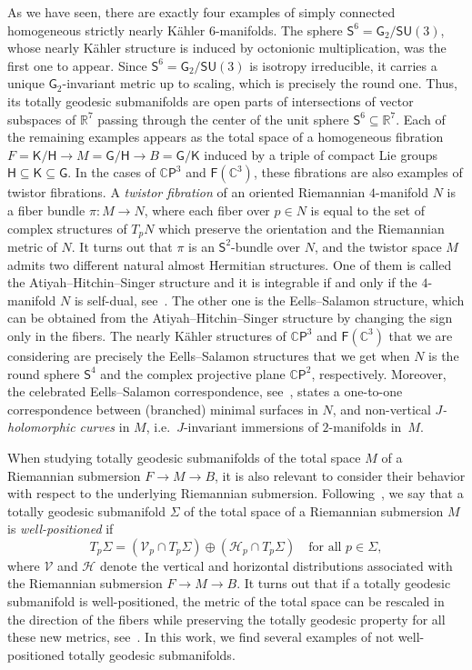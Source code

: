 \documentclass[11pt,a4paper,final]{amsart}
\newcommand{\s}{\mathsf}
\newcommand{\R}{\mathbb{R}}
\newcommand{\C}{\mathbb{C}}
\theoremstyle{definition}
\begin{document}
As we have seen, there are exactly four examples of  simply connected homogeneous strictly nearly Kähler $6$-manifolds.
The sphere $\s{S}^6=\s{G}_2/\s{SU}(3)$, whose nearly Kähler structure is induced by octonionic multiplication, was the first one to appear.
Since $\s{S}^6=\s{G}_2/\s{SU}(3)$ is isotropy irreducible, it carries a unique $\s{G}_2$-invariant metric up to scaling, which is precisely the round one.
Thus, its totally geodesic submanifolds are open parts of intersections of vector subspaces of $\R^7$ passing through the center of the unit sphere $\s{S}^6\subseteq\R^7$.
Each of the remaining examples appears as the total space of a homogeneous fibration
$F=\s{K}/\s{H}\rightarrow M=\s{G}/\s{H}\rightarrow B=\s{G}/\s{K}$
induced by a triple of compact Lie groups $\s{H}\subseteq \s{K}\subseteq \s{G}$.
In the cases of $\C\s{P}^3$ and $\s{F}(\C^3)$, these fibrations are also examples of twistor fibrations.
A \textit{twistor fibration} of an oriented Riemannian  $4$-manifold $N$ is a fiber bundle $\pi\colon M\rightarrow N$, where each fiber over $p\in N$ is equal to the set of complex structures of $T_p N$ which preserve the orientation and the Riemannian metric of $N$. It turns out that $\pi$ is an $\s{S}^2$-bundle over $N$, and the twistor space $M$ admits two different natural almost Hermitian structures. One of them is called the Atiyah--Hitchin--Singer structure and it is integrable if and only if the $4$-manifold $N$ is self-dual, see~\cite{atiyah}. The other one is the Eells--Salamon structure, which can be obtained from the  Atiyah--Hitchin--Singer structure by changing the sign only in the fibers.  The nearly Kähler structures of $\C\s{P}^3$ and $\s{F}(\C^3)$ that we are considering are precisely the Eells--Salamon structures that we get when $N$ is the round sphere $\s{S}^4$ and the complex projective plane $\C\s{P}^2$, respectively. Moreover,  the celebrated Eells--Salamon correspondence, see~\cite{eels}, states a one-to-one correspondence between (branched) minimal surfaces in $N$, and non-vertical \textit{$J$-holomorphic curves} in $M$, i.e.\ $J$-invariant immersions of $2$-manifolds in~$M$.

When studying totally geodesic submanifolds of the total space $M$ of a Riemannian submersion  $F\rightarrow M\rightarrow B$, it is also relevant to consider their behavior with respect to the underlying Riemannian submersion. Following~\cite{RodriguezVazquezOlmos}, we say that a totally geodesic submanifold $\Sigma$ of the total space of a Riemannian submersion $M$ is \textit{well-positioned} if 
\[T_p \Sigma= (\mathcal{V}_p \cap T_p \Sigma) \oplus (\mathcal{H}_p \cap T_p \Sigma) \quad \text{for all $p\in\Sigma$},\]
where $\mathcal{V}$ and $\mathcal{H}$ denote the vertical and horizontal distributions associated with the Riemannian submersion $F\rightarrow M\rightarrow B$. It turns out that if a totally geodesic submanifold is well-positioned, the metric of the total space can be rescaled in the direction of the fibers while preserving the totally geodesic property for all these new metrics, see~\cite[Lemma 3.12]{dearricott}.  In this work, we find several examples of not well-positioned totally geodesic submanifolds.
\end{document}
